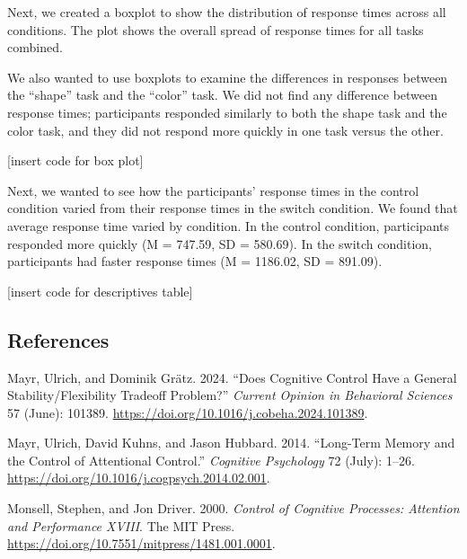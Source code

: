\documentclass[
  11pt,
]{article}
\newlength{\cslhangindent}
\newenvironment{CSLReferences}[2] %
 {\begin{list}{}{%
  \setlength{\itemindent}{0pt}
  \setlength{\leftmargin}{0pt}
  \setlength{\parsep}{0pt}
  \ifodd #1
   \setlength{\leftmargin}{\cslhangindent}
   \setlength{\itemindent}{-1\cslhangindent}
  \fi
  \setlength{\itemsep}{#2\baselineskip}}}
 {\end{list}}
\begin{document}
Next, we created a boxplot to show the distribution of response times
across all conditions. The plot shows the overall spread of response
times for all tasks combined.

We also wanted to use boxplots to examine the differences in responses
between the ``shape'' task and the ``color'' task. We did not find any
difference between response times; participants responded similarly to
both the shape task and the color task, and they did not respond more
quickly in one task versus the other.

{[}insert code for box plot{]}

Next, we wanted to see how the participants' response times in the
control condition varied from their response times in the switch
condition. We found that average response time varied by condition. In
the control condition, participants responded more quickly (M = 747.59,
SD = 580.69). In the switch condition, participants had faster response
times (M = 1186.02, SD = 891.09).

{[}insert code for descriptives table{]}

\newpage

\subsection*{References}\label{references}

\label{refs}
\begin{CSLReferences}{1}{0}
Mayr, Ulrich, and Dominik Grätz. 2024. {``Does Cognitive Control Have a
General Stability/Flexibility Tradeoff Problem?''} \emph{Current Opinion
in Behavioral Sciences} 57 (June): 101389.
\url{https://doi.org/10.1016/j.cobeha.2024.101389}.

Mayr, Ulrich, David Kuhns, and Jason Hubbard. 2014. {``Long-Term Memory
and the Control of Attentional Control.''} \emph{Cognitive Psychology}
72 (July): 1--26. \url{https://doi.org/10.1016/j.cogpsych.2014.02.001}.

Monsell, Stephen, and Jon Driver. 2000. \emph{Control of {Cognitive}
{Processes}: {Attention} and {Performance} {XVIII}}. The MIT Press.
\url{https://doi.org/10.7551/mitpress/1481.001.0001}.

\end{CSLReferences}
\end{document}
